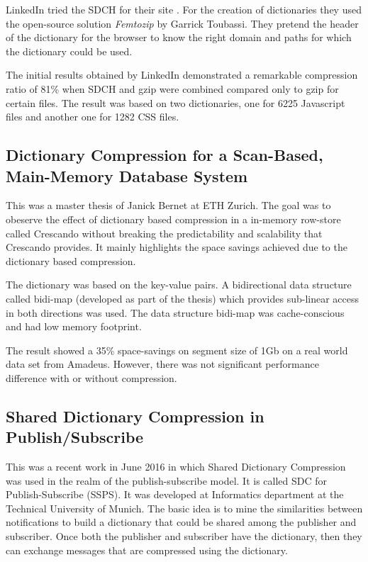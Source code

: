 LinkedIn tried the SDCH for their site \parencite{sdc_linkedin}. For the creation of dictionaries they used the open-source solution \textit{Femtozip} by Garrick Toubassi. They pretend the header of the dictionary for the browser to know the right domain and paths for which the dictionary could be used. 

The initial results obtained by LinkedIn demonstrated a remarkable compression ratio of 81\% when SDCH and gzip were combined compared only to gzip for certain files. The result was based on two dictionaries, one for 6225 Javascript files and another one for 1282 CSS files. 

\subsection{Dictionary Compression for a Scan-Based, Main-Memory Database System}

This was a master thesis of Janick Bernet at ETH Zurich. The goal was to obeserve the effect of dictionary based compression in a in-memory row-store called Crescando \parencite{crescando} without breaking the predictability and scalability that Crescando provides. It mainly highlights the space savings achieved due to the dictionary based compression.

The dictionary was based on the key-value pairs. A bidirectional data structure called bidi-map (developed as part of the thesis) which provides sub-linear access in both directions was used. The data structure bidi-map was cache-conscious and had low memory footprint. 

The result showed a 35\% space-savings on segment size of 1Gb on a real world data set from Amadeus. However, there was not significant performance difference with or without compression. 

\subsection{Shared Dictionary Compression in Publish/Subscribe}

This was a recent work in June 2016 in which Shared Dictionary Compression was used in the realm of the publish-subscribe model. It is called SDC for Publish-Subscribe (SSPS). It was developed at Informatics department at the Technical University of Munich. The basic idea is to mine the similarities between notifications to build a dictionary that could be shared among the publisher and subscriber. Once both the publisher and subscriber have the dictionary, then they can exchange messages that are compressed using the dictionary.

